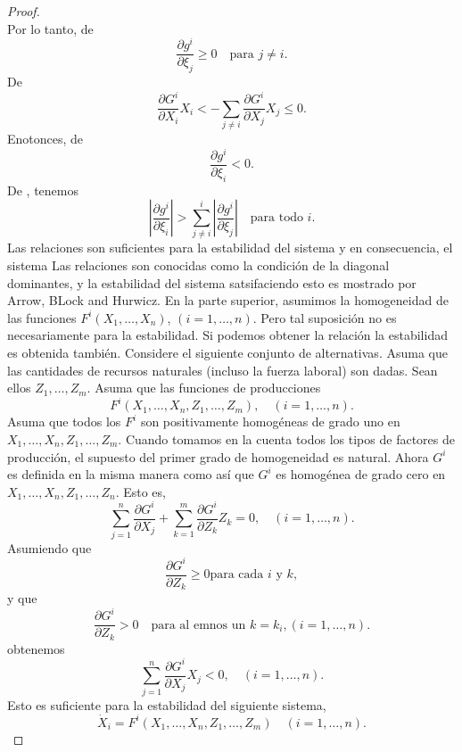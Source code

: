 \begin{proof}
\begin{equation}
	\end{equation}
	Por lo tanto, de %
	\begin{equation}
	\frac{\partial g^{i}}{\partial\xi_{j}}\geq0\quad\text{para }j\neq i.
	\end{equation}
	De %
	\begin{equation}
	\frac{\partial G^{i}}{\partial X_{i}}X_{i}<-\sum_{j\neq i}\dfrac{\partial G^{i}}{\partial X_{j}}X_{j}\leq 0.
	\end{equation}
	Enotonces, de %
	\begin{equation}
	\frac{\partial g^{i}}{\partial \xi_{i}}<0.
	\end{equation}
	De %
	, tenemos
	\begin{equation}
	\left|\frac{\partial g^{i}}{\partial\xi_{i}}\right|>\sum_{j\neq i}^{i}\left|\frac{\partial g^{i}}{\partial\xi_{j}}\right|\quad\text{para todo } i.
	\end{equation}
	Las relaciones %
	son suficientes para la estabilidad del sistema %
	y en consecuencia, el sistema %
	Las relaciones %
	son conocidas como la condición de la diagonal dominantes, y la estabilidad del sistema satsifaciendo esto es mostrado por Arrow, BLock and Hurwicz. %
	En la parte superior, asumimos la homogeneidad de las funciones $F^{i}\left(X_{1},\ldots,X_{n}\right)$, $\left(i=1,\ldots,n\right)$. Pero tal suposición no es necesariamente para la estabilidad. Si podemos obtener la relación %
	la estabilidad es obtenida también. Considere el siguiente conjunto de alternativas. Asuma que las cantidades de recursos naturales (incluso la fuerza laboral) son dadas. Sean ellos $Z_{1},\ldots,Z_{m}$. Asuma que las funciones de producciones %
	\[ F^{i}\left(X_{1},\ldots,X_{n},Z_{1},\ldots,Z_{m}\right),\quad\left(i=1,\ldots,n\right). \] Asuma que todos los $F^{i}$ son positivamente homogéneas de grado uno en $X_{1},\ldots,X_{n},Z_{1},\ldots,Z_{m}$. Cuando tomamos en la cuenta todos los tipos de factores de producción, el supuesto del primer grado de homogeneidad es natural. Ahora $G^{i}$ es definida en la misma manera como %
	así que $G^{i}$ es homogénea de grado cero en $X_{1},\ldots,X_{n},Z_{1},\ldots,Z_{n}$. Esto es, \[ \sum_{j=1}^{n}\dfrac{\partial G^{i}}{\partial X_{j}}+\sum_{k=1}^{m}\frac{\partial G^{i}}{\partial Z_{k}}Z_{k}=0,\quad\left(i=1,\ldots,n\right). \] Asumiendo que \[ \frac{\partial G^{i}}{\partial Z_{k}}\geq0\text{para cada }i\text{ y }k, \] y que \[ \dfrac{\partial G^{i}}{\partial Z_{k}}>0\quad\text{para al emnos un } k=k_{i},\left(i=1,\ldots,n\right). \] obtenemos \[ \sum_{j=1}^{n}\frac{\partial G^{i}}{\partial X_{j}}X_{j}<0,\quad\left(i=1,\ldots,n\right). \] Esto es suficiente para la estabilidad del siguiente sistema, \[ \dot{X}_{i}=F^{i}\left(X_{1},\ldots,X_{n},Z_{1},\ldots,Z_{m}\right)\quad\left(i=1,\ldots,n\right). \]
	
\end{proof}